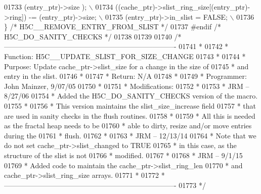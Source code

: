 \begin{DoxyCode}
01733 \textcolor{preprocessor}{              (entry\_ptr)->size );                                          \(\backslash\)}
01734 \textcolor{preprocessor}{    ((cache\_ptr)->slist\_ring\_size[(entry\_ptr)->ring]) -= (entry\_ptr)->size; \(\backslash\)}
01735 \textcolor{preprocessor}{    (entry\_ptr)->in\_slist = FALSE;                                          \(\backslash\)}
01736 \textcolor{preprocessor}{\} }\textcolor{comment}{/* H5C\_\_REMOVE\_ENTRY\_FROM\_SLIST */}\textcolor{preprocessor}{}
01737 \textcolor{preprocessor}{#endif }\textcolor{comment}{/* H5C\_DO\_SANITY\_CHECKS */}\textcolor{preprocessor}{}
01738 
01739 
01740 \textcolor{comment}{/*-------------------------------------------------------------------------}
01741 \textcolor{comment}{ *}
01742 \textcolor{comment}{ * Function:    H5C\_\_UPDATE\_SLIST\_FOR\_SIZE\_CHANGE}
01743 \textcolor{comment}{ *}
01744 \textcolor{comment}{ * Purpose:     Update cache\_ptr->slist\_size for a change in the size of}
01745 \textcolor{comment}{ *      and entry in the slist.}
01746 \textcolor{comment}{ *}
01747 \textcolor{comment}{ * Return:      N/A}
01748 \textcolor{comment}{ *}
01749 \textcolor{comment}{ * Programmer:  John Mainzer, 9/07/05}
01750 \textcolor{comment}{ *}
01751 \textcolor{comment}{ * Modifications:}
01752 \textcolor{comment}{ *}
01753 \textcolor{comment}{ *      JRM -- 8/27/06}
01754 \textcolor{comment}{ *      Added the H5C\_DO\_SANITY\_CHECKS version of the macro.}
01755 \textcolor{comment}{ *}
01756 \textcolor{comment}{ *      This version maintains the slist\_size\_increase field}
01757 \textcolor{comment}{ *      that are used in sanity checks in the flush routines.}
01758 \textcolor{comment}{ *}
01759 \textcolor{comment}{ *      All this is needed as the fractal heap needs to be}
01760 \textcolor{comment}{ *      able to dirty, resize and/or move entries during the}
01761 \textcolor{comment}{ *      flush.}
01762 \textcolor{comment}{ *}
01763 \textcolor{comment}{ *      JRM -- 12/13/14}
01764 \textcolor{comment}{ *      Note that we do not set cache\_ptr->slist\_changed to TRUE }
01765 \textcolor{comment}{ *      in this case, as the structure of the slist is not}
01766 \textcolor{comment}{ *      modified.}
01767 \textcolor{comment}{ *}
01768 \textcolor{comment}{ *      JRM -- 9/1/15}
01769 \textcolor{comment}{ *      Added code to maintain the cache\_ptr->slist\_ring\_len}
01770 \textcolor{comment}{ *      and cache\_ptr->slist\_ring\_size arrays.}
01771 \textcolor{comment}{ *}
01772 \textcolor{comment}{ *-------------------------------------------------------------------------}
01773 \textcolor{comment}{ */}

\end{DoxyCode}
